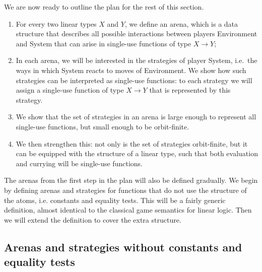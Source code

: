 We are now ready to outline the plan for the rest of this section. 
\begin{enumerate}
    \item For every two linear types $X$ and $Y$, we  define an arena, which is a data structure that describes all possible interactions between players Environment and System that can arise in single-use  functions of type $X \to Y$;
    \item In each arena, we will be interested in the strategies of player System, i.e.~the ways in which System reacts to moves of Environment. We show how such strategies can be interpreted as single-use functions: to each strategy we will assign a single-use function of type $X \to Y$ that is represented by this strategy. 
    \item We show that the  set of strategies in an arena is  large enough to represent all single-use functions, but small enough to be orbit-finite. 
    \item We then strengthen this: not only is the set of strategies orbit-finite, but it can be equipped with the structure of a linear type, such that both evaluation and currying will be single-use functions.
\end{enumerate}

The arenas from the first step in the plan will also be defined gradually. We begin by defining arenas and strategies for functions that do not use the structure of the atoms, i.e. constants and equality tests. This will be a fairly generic definition, almost identical to the classical game semantics for linear logic. Then we will extend the definition to cover the extra structure. 

\subsection{Arenas and strategies without constants and equality tests}
\label{sec:arenas-without-constants-and-equality-tests}


